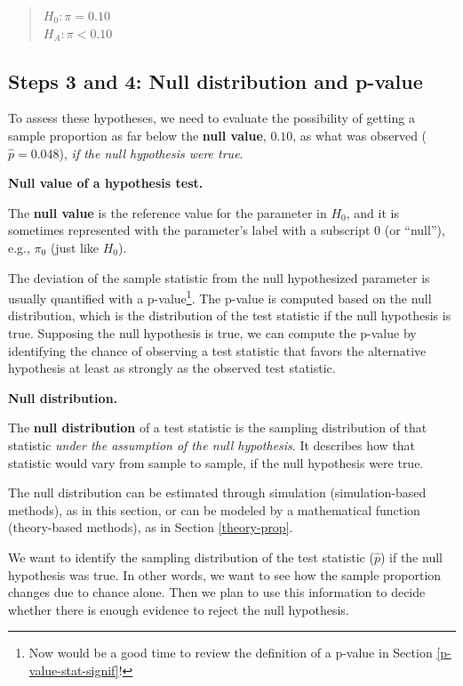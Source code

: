 \documentclass[
  10pt,
  openany]{book}
\theoremstyle{definition}
\theoremstyle{definition}
\theoremstyle{definition}
\theoremstyle{definition}
\theoremstyle{remark}
\begin{document}
\begin{quote}
\(H_0: \pi=0.10\)\\
\(H_A: \pi<0.10\)
\end{quote}

\subsection*{Steps 3 and 4: Null distribution and p-value}\label{steps-3-and-4-null-distribution-and-p-value}

To assess these hypotheses, we need to evaluate the possibility of getting a sample proportion as far below the \textbf{null value}, \(0.10\), as what was observed (\(\hat{p} = 0.048\)), \emph{if the null hypothesis were true}.

\textbf{Null value of a hypothesis test.}

The \textbf{null value} is the reference value for the parameter in \(H_0\), and it is sometimes represented with the parameter's label with a subscript 0 (or ``null''), e.g., \(\pi_0\) (just like \(H_0\)).

The deviation of the sample statistic from the null hypothesized parameter is usually quantified with a p-value\footnote{Now would be a good time to review the definition of a p-value in Section \ref{p-value-stat-signif}!}. The p-value is computed based on the null distribution, which is the distribution of the test statistic if the null hypothesis is true. Supposing the null hypothesis is true, we can compute the p-value by identifying the chance of observing a test statistic that favors the alternative hypothesis at least as strongly as the observed test statistic.

\textbf{Null distribution.}

The \textbf{null distribution} of a test statistic is the sampling distribution of that statistic \emph{under the assumption of the null hypothesis}. It describes how that statistic would vary from sample to sample, if the null hypothesis were true.

The null distribution can be estimated through simulation (simulation-based methods), as in this section, or can be modeled by a mathematical function (theory-based methods), as in Section \ref{theory-prop}.

We want to identify the sampling distribution of the test statistic (\(\hat{p}\)) if the null hypothesis was true. In other words, we want to see how the sample proportion changes due to chance alone. Then we plan to use this information to decide whether there is enough evidence to reject the null hypothesis.
\end{document}
